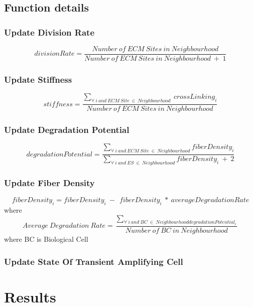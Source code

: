 \documentclass[a4paper,10pt]{article}
\begin{document}
\subsection{Function details}

\subsubsection{Update Division Rate}
\begin{equation}
 divisionRate = \frac{Number\ of\ ECM\ Sites\ in\ Neighbourhood}{ Number\ of\ ECM\ Sites\ in\ Neighbourhood\ +\ 1 }
\end{equation}

\subsubsection{Update Stiffness}
\begin{equation}
 stiffness = \frac{ \sum_{ \forall\ i\ and\ ECM\ Site\ \in\ Neighbourhood }\ crossLinking_i }{ Number\ of\ ECM\ Sites\ in\ Neighbourhood }
\end{equation}

\subsubsection{Update Degradation Potential}
\begin{equation}
 degradationPotential = \frac{\sum_{\forall\ i\ and\ ECM\ Site\  \in\ Neighbourhood} fiberDensity_i}
 {{\sum_{\forall\ i\ and\ ES\  \in\ Neighbourhood} fiberDensity_i\ +\ 2}}
\end{equation}

\subsubsection{Update Fiber Density}
\begin{equation}
 fiberDensity_i = fiberDensity_i\ -\ 
 \ fiberDensity_i\ *\ averageDegradationRate
\end{equation} 
where 
\begin{equation}
 Average\ Degradation\ Rate = \frac{\sum_{\forall\ i\ and\ BC\ \in\ Neighbourhood degradationPotential_i } }
 { Number\ of\ BC\ in\ Neighbourhood }
\end{equation}
where BC is Biological Cell

\subsubsection{Update State Of Transient Amplifying Cell}



 
 




\section{Results}
\end{document}
